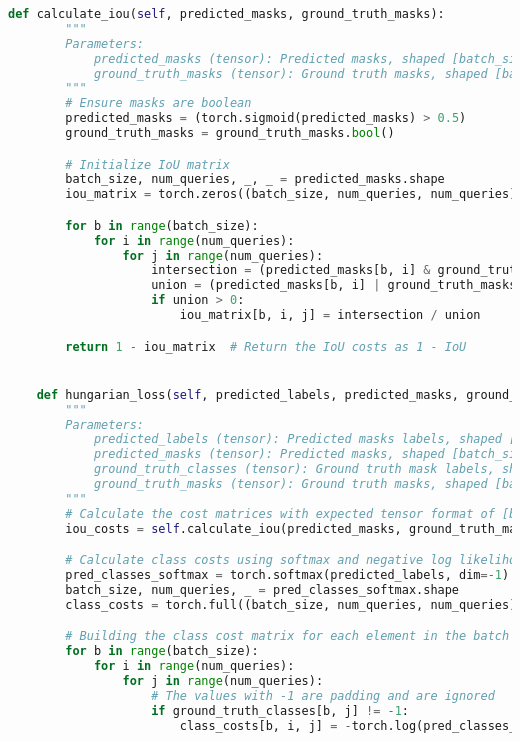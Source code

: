 \begin{lstlisting}[language=Python, caption=Extended Masked-Attention Mask Transformer Model Class]
    def calculate_iou(self, predicted_masks, ground_truth_masks):
        """
        Parameters:
            predicted_masks (tensor): Predicted masks, shaped [batch_size, num_queries, height, width]
            ground_truth_masks (tensor): Ground truth masks, shaped [batch_size, num_queries, height, width]
        """
        # Ensure masks are boolean
        predicted_masks = (torch.sigmoid(predicted_masks) > 0.5)
        ground_truth_masks = ground_truth_masks.bool()

        # Initialize IoU matrix
        batch_size, num_queries, _, _ = predicted_masks.shape
        iou_matrix = torch.zeros((batch_size, num_queries, num_queries), device=predicted_masks.device)

        for b in range(batch_size):
            for i in range(num_queries):
                for j in range(num_queries):
                    intersection = (predicted_masks[b, i] & ground_truth_masks[b, j]).float().sum()
                    union = (predicted_masks[b, i] | ground_truth_masks[b, j]).float().sum()
                    if union > 0:
                        iou_matrix[b, i, j] = intersection / union

        return 1 - iou_matrix  # Return the IoU costs as 1 - IoU


    def hungarian_loss(self, predicted_labels, predicted_masks, ground_truth_classes, ground_truth_masks):
        """
        Parameters:
            predicted_labels (tensor): Predicted masks labels, shaped [batch_size, num_queries, number_classes]
            predicted_masks (tensor): Predicted masks, shaped [batch_size, num_queries, height, width]
            ground_truth_classes (tensor): Ground truth mask labels, shaped [batch_size, num_queries, number_classes]
            ground_truth_masks (tensor): Ground truth masks, shaped [batch_size, num_queries, height, width]
        """
        # Calculate the cost matrices with expected tensor format of [batch_size, num_queries, num_queries]
        iou_costs = self.calculate_iou(predicted_masks, ground_truth_masks)

        # Calculate class costs using softmax and negative log likelihood
        pred_classes_softmax = torch.softmax(predicted_labels, dim=-1)
        batch_size, num_queries, _ = pred_classes_softmax.shape
        class_costs = torch.full((batch_size, num_queries, num_queries), float('inf'), device=self.device)

        # Building the class cost matrix for each element in the batch
        for b in range(batch_size):
            for i in range(num_queries):
                for j in range(num_queries):
                    # The values with -1 are padding and are ignored
                    if ground_truth_classes[b, j] != -1:  
                        class_costs[b, i, j] = -torch.log(pred_classes_softmax[b, i, ground_truth_classes[b, j]] + 1e-6)  # Added epsilon to avoid log(0)


\end{lstlisting}
